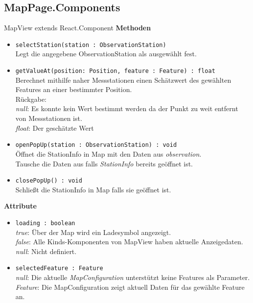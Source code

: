 \subsection{MapPage.Components}

    \begin{Class}{MapView extends React.Component}
        \textbf{Methoden}
        \begin{itemize}
            \item \texttt{selectStation(station : ObservationStation)}
            \\ Legt die angegebene ObservationStation als ausgewählt fest.
            \item \texttt{getValueAt(position: Position, feature : Feature) : float}
            \\ Berechnet mithilfe naher Messstationen einen Schätzwert des gewählten Features an einer bestimmter Position.
            \\ Rückgabe:
            \\ \emph{null}: Es konnte kein Wert bestimmt werden da der Punkt zu weit entfernt von Messstationen ist.
            \\ \emph{float}: Der geschätzte Wert
            \item \texttt{openPopUp(station : ObservationStation) : void}
            \\ Öffnet die StationInfo in Map mit den Daten aus \emph{observation}.
            \\ Tausche die Daten aus falls \emph{StationInfo} bereits geöffnet ist.
            \item \texttt{closePopUp() : void}
            \\ Schließt die StationInfo in Map falls sie geöffnet ist.
        \end{itemize}
        \textbf{Attribute}
        \begin{itemize}
            \item \texttt{loading : boolean}
            \\ \emph{true}: Über der Map wird ein Ladesymbol angezeigt.
            \\ \emph{false}: Alle Kinds-Komponenten von MapView haben aktuelle Anzeigedaten.
            \\ \emph{null}: Nicht definiert.
            \item \texttt{selectedFeature : Feature}
            \\ \emph{null}: Die aktuelle \emph{MapConfiguration} unterstützt keine Features als Parameter.
            \\ \emph{Feature}: Die MapConfiguration zeigt aktuell Daten für das gewählte Feature an.
        \end{itemize}
    \end{Class}

